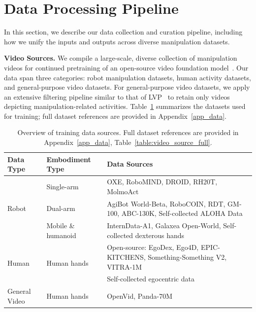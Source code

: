 
\vspace{-1mm}
\section{Data Processing Pipeline}
\vspace{-1mm}
In this section, we describe our data collection and curation pipeline, including how we unify the inputs and outputs across diverse manipulation datasets.

\textbf{Video Sources.}
We compile a large-scale, diverse collection of manipulation videos for continued pretraining of an open-source video foundation model~\citep{wan2025wan}. Our data span three categories: robot manipulation datasets, human activity datasets, and general-purpose video datasets. For general-purpose video datasets, we apply an extensive filtering pipeline similar to that of LVP~\citep{chen2025large} to retain only videos depicting manipulation-related activities. Table~\ref{table:video_source} summarizes the datasets used for training; full dataset references are provided in Appendix~\ref{app_data}.

\begin{table}[h]
    \centering
    \small
    \setlength{\tabcolsep}{4pt}
    \renewcommand{\arraystretch}{1}
    \begin{tabularx}{\linewidth}{@{}llX@{}}
        \toprule
        Data Type & Embodiment Type & Data Sources \\
        \midrule
        \multirow{3}{*}{Robot}
        & Single-arm
        & OXE, RoboMIND, DROID, RH20T, MolmoAct \\
        & Dual-arm
        & AgiBot World-Beta, RoboCOIN, RDT, GM-100, ABC-130K, Self-collected ALOHA Data\\
        & Mobile \& humanoid
        & InternData-A1, Galaxea Open-World, Self-collected dexterous hands \\
        \midrule
        \multirow{2}{*}{Human}
        & \multirow{2}{*}{Human hands}
        & Open-source: EgoDex, Ego4D, EPIC-KITCHENS, Something-Something V2, VITRA-1M \\
        & & Self-collected egocentric data\\
        \midrule
        General Video
        & Human hands
        & OpenVid, Panda-70M \\
        \bottomrule
    \end{tabularx}
    \caption{Overview of training data sources. Full dataset references are provided in Appendix~\ref{app_data}, Table~\ref{table:video_source_full}.}
    \label{table:video_source}
    \vspace{-3mm}
\end{table}

